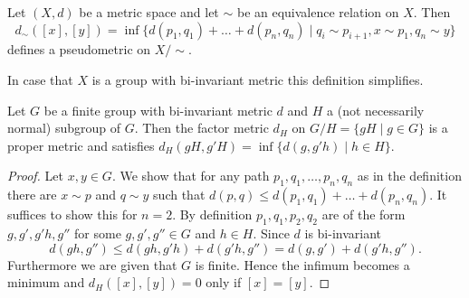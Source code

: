 \begin{definition}
Let $(X,d)$ be a metric space and let $\sim$ be an equivalence relation on $X$. Then \[d_\sim([x],[y])=\inf\{d(p_1,q_1)+\dots+d(p_n,q_n)\mid q_i\sim p_{i+1}, x\sim p_1, q_n\sim y\}\] defines a pseudometric on $X/{\sim}$.
\end{definition}

In case that $X$ is a group with bi-invariant metric this definition simplifies.
\begin{lemma}\label{lem:factorMetric}
Let $G$ be a finite group with bi-invariant metric $d$ and $H$ a (not necessarily normal) subgroup of $G$. Then the factor metric $d_H$ on $G/H=\{gH\mid g\in G\}$ is a proper metric and satisfies $d_H(gH,g'H)=\inf\{d(g,g'h)\mid h\in H\}$.
\end{lemma}
\begin{proof}
Let $x,y\in G$. We show that for any path $p_1,q_1,\dots,p_n,q_n$ as in the definition there are $x\sim p$ and $q\sim y$ such that $d(p,q)\leq d(p_1,q_1)+\dots+d(p_n,q_n)$. It suffices to show this for $n=2$. 
By definition $p_1,q_1,p_2,q_2$ are of the form $g,g',g'h,g''$ for some $g,g',g''\in G$ and $h\in H$. Since $d$ is bi-invariant 
\[d(gh,g'')\leq d(gh,g'h)+d(g'h,g'')=d(g,g')+d(g'h,g'').\]
Furthermore we are given that $G$ is finite. Hence the infimum becomes a minimum and $d_H([x],[y])=0$ only if $[x]=[y]$.
\end{proof}

